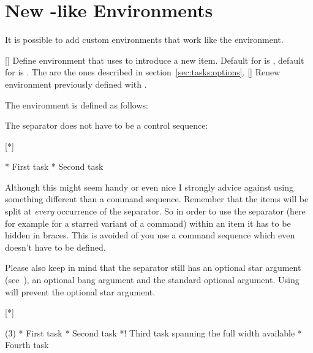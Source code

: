 \documentclass[load-preamble+]{cnltx-doc}
\begin{document}
\section{New -like Environments}
It is possible to add custom environments that work like the 
environment.
\begin{commands}
  []
    Define environment  that uses  to introduce a
    new item.  Default for  is , default for
     is .  The  are the ones described in
    section~\ref{sec:tasks:options}.
  []
    Renew environment previously defined with .
\end{commands}
The  environment is defined as follows:
\begin{sourcecode}
\end{sourcecode}

The separator does not have to be a control sequence:
\begin{example}
  [*]
  \begin{done}
    * First task
    * Second task
  \end{done}
\end{example}
Although this might seem handy or even nice I strongly advice against using
something different than a command sequence. Remember that the items will be
split at \emph{every} occurrence of the separator.  So in order to use the
separator (here for example for a starred variant of a command) within an item
it has to be hidden in braces.  This is avoided of you use a command sequence
which even doesn't have to be defined.

Please also keep in mind that the separator still has an optional star
argument (see~\pageref{optional-star}), an optional bang argument and the
standard optional argument.  Using \code{*} will prevent the optional star
argument.

\begin{example}
  [*]
  \begin{done}(3)
    * First task
    * Second task
    *! Third task spanning the full width available
    * Fourth task
  \end{done}
\end{example}
\end{document}
